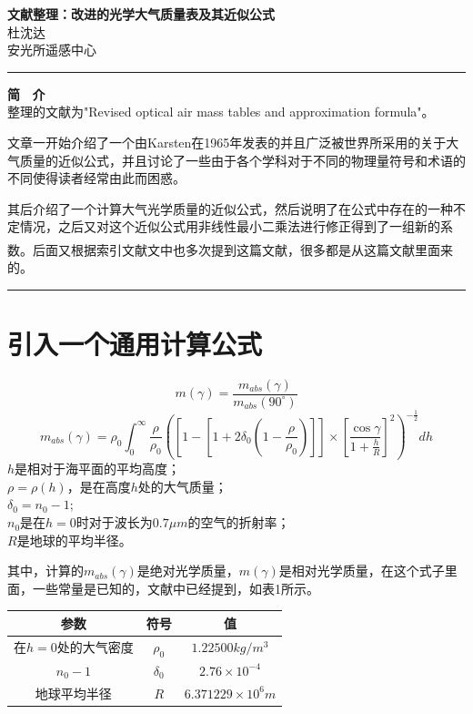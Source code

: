 \documentclass{aaa}
\makeatletter
\newcommand{\upcite}[1]{\textsuperscript{\textsuperscript{\cite{#1}}}}
\newcommand{\tabcaption}{\def\@captype{table}\caption}
\makeatother
\begin{document}
\begin{center}
\LARGE
  \textbf{文献整理：改进的光学大气质量表及其近似公式}\\
  \vspace{0.2em}
  \large
    杜沈达 \\%
  安光所遥感中心
  \end{center}
\rule[0.1\baselineskip]{\textwidth}{0.5pt}
\textbf{简 \ 介}\\
\large
整理的文献为"Revised optical air mass tables and approximation formula"。

文章一开始介绍了一个由Karsten在1965年发表的并且广泛被世界所采用的关于大气质量的近似公式，并且讨论了一些由于各个学科对于不同的物理量符号和术语的不同使得读者经常由此而困惑。

其后介绍了一个计算大气光学质量的近似公式，然后说明了在公式中存在的一种不定情况，之后又对这个近似公式用非线性最小二乘法进行修正得到了一组新的系数。后面又根据索引文献\upcite{bib:one}文中也多次提到这篇文献，很多都是从这篇文献里面来的。
\\
\rule[0.1\baselineskip]{\textwidth}{0.5pt}
\section{引入一个通用计算公式}
\begin{equation}
	m(\gamma)=\frac{m_{abs}(\gamma)}{m_{abs}(90^{\circ})}
\end{equation}
\begin{equation}
	m_{abs}(\gamma)=\rho_{0}\int^{\infty}_{0} \frac{\rho}{\rho_{0}}([1-[1+2\delta_{0}(1-\frac{\rho}{\rho_{0}})]]\times
	[\frac{\cos \gamma}{1+\frac{h}{R}}]^{2})^{-\frac{1}{2}}dh
\end{equation}
	$h$是相对于海平面的平均高度；\\
	$\rho=\rho(h)$，是在高度$h$处的大气质量；\\
	$\delta_{0}=n_{0}-1$;\\
	$n_{0}$是在$h=0$时对于波长为$0.7\mu m$的空气的折射率；\\
	$R$是地球的平均半径。
	
其中，计算的$m_{abs}(\gamma)$是绝对光学质量，$m(\gamma)$是相对光学质量，在这个式子里面，一些常量是已知的，文献中已经提到，如表1所示。
\begin{center}
	\tabcaption{已知参数表}
	\begin{tabular}{|c|c|c|}
		\hline 
		参数&符号      &值  \\ \hline
		在$h=0$处的大气密度&$\rho_{0}$&$1.22500kg/m^{3}$\\ \hline
		$n_{0}-1$&$\delta_{0}$&$2.76\times 10^{-4}$\\ \hline
		地球平均半径&$R$	&$6.371229\times 10^{6}m$\\ \hline
	\end{tabular}
\end{center}
\end{document}
